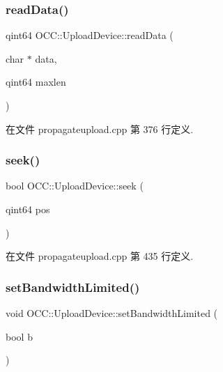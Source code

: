 \subsubsection{\texorpdfstring{read\+Data()}{readData()}}
{\footnotesize\ttfamily qint64 O\+C\+C\+::\+Upload\+Device\+::read\+Data (\begin{DoxyParamCaption}\item[{char $\ast$}]{data,  }\item[{qint64}]{maxlen }\end{DoxyParamCaption})}



在文件 propagateupload.\+cpp 第 376 行定义.

\mbox{\label{class_o_c_c_1_1_upload_device_a966ab3a0165321a5ebd04db0cb300c72}} 
\subsubsection{\texorpdfstring{seek()}{seek()}}
{\footnotesize\ttfamily bool O\+C\+C\+::\+Upload\+Device\+::seek (\begin{DoxyParamCaption}\item[{qint64}]{pos }\end{DoxyParamCaption})}



在文件 propagateupload.\+cpp 第 435 行定义.

\mbox{\label{class_o_c_c_1_1_upload_device_a3a401fc06327e59d5e49baf517035f45}} 
\subsubsection{\texorpdfstring{set\+Bandwidth\+Limited()}{setBandwidthLimited()}}
{\footnotesize\ttfamily void O\+C\+C\+::\+Upload\+Device\+::set\+Bandwidth\+Limited (\begin{DoxyParamCaption}\item[{bool}]{b }\end{DoxyParamCaption})}



